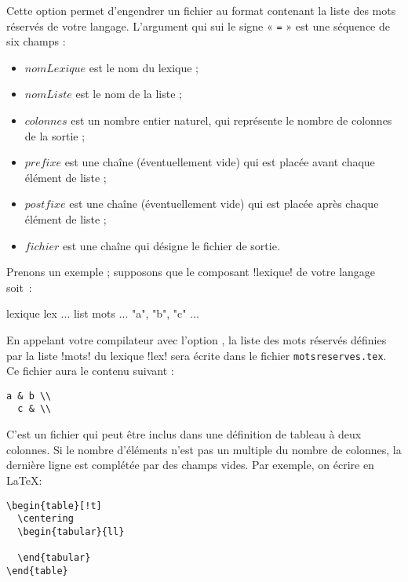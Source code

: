  Cette option permet d'engendrer un fichier au format contenant la liste des mots réservés de votre langage. L'argument qui sui le signe « \texttt{=} » est une séquence de six champs :
\begin{itemize}
  \item $nomLexique$ est le nom du lexique ;
  \item $nomListe$ est le nom de la liste ;
  \item $colonnes$ est un nombre entier naturel, qui représente le nombre de colonnes de la sortie ;
  \item $prefixe$ est une chaîne (éventuellement vide) qui est placée avant chaque élément de liste ;
  \item $postfixe$ est une chaîne (éventuellement vide) qui est placée après chaque élément de liste ;
  \item $fichier$ est une chaîne qui désigne le fichier de sortie.
\end{itemize}

Prenons un exemple ; supposons que le composant \ggs!lexique! de votre langage soit~:
\begin{galgas}
lexique lex {
  ...
  list mots ... { "a", "b", "c" }
  ...
}
\end{galgas}

En appelant votre compilateur avec l'option , la liste des mots réservés définies par la liste \ggs!mots! du lexique \ggs!lex! sera écrite dans le fichier \texttt{motsreserves.tex}. Ce fichier aura le contenu suivant :
\begin{lstlisting}[backgroundcolor=\color{yellow!10}, frame=tlbr, basicstyle=\small\tt]
  a & b \\
  c & \\
\end{lstlisting}

C'est un fichier qui peut être inclus dans une définition de tableau à deux colonnes. Si le nombre d'éléments n'est pas un multiple du nombre de colonnes, la dernière ligne est complétée par des champs vides. Par exemple, on écrire en \LaTeX :
\begin{lstlisting}[backgroundcolor=\color{yellow!10}, frame=tlbr, basicstyle=\small\tt]
\begin{table}[!t]
  \centering
  \begin{tabular}{ll}
    
  \end{tabular}
\end{table}
\end{lstlisting}

